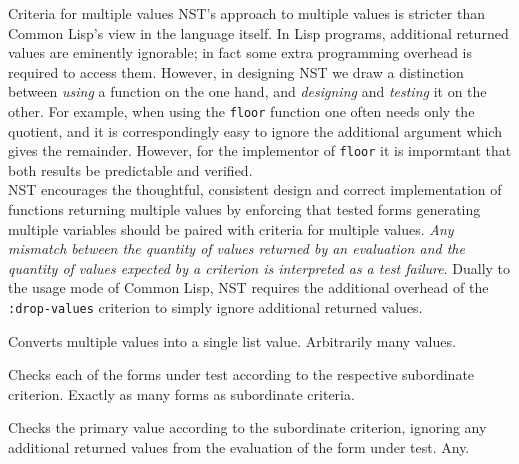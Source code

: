 \begin{criteriaGroup}{Criteria for multiple values}{
NST's approach to multiple values is stricter than Common Lisp's view
in the language itself.  In Lisp programs, additional returned values
are eminently ignorable; in fact some extra programming overhead is
required to access them.  However, in designing NST we draw a
distinction between \emph{using} a function on the one hand, and
\emph{designing} and \emph{testing} it on the other.  For example,
when using the \texttt{floor} function one often needs only the
quotient, and it is correspondingly easy to ignore the additional
argument which gives the remainder.  However, for the implementor of
\texttt{floor} it is impormtant that both results be predictable and
verified.\vspace{\parskip}\\\hspace*{\parindent}NST encourages the
thoughtful, consistent design and correct implementation of functions
returning multiple values by enforcing that tested forms generating
multiple variables should be paired with criteria for multiple values.
\emph{Any mismatch between the quantity of values returned by an
  evaluation and the quantity of values expected by a criterion is
  interpreted as a test failure}.  Dually to the usage mode of Common
Lisp, NST requires the additional overhead of the
\texttt{:drop-values} criterion to simply ignore additional returned
values.}

{Converts multiple values into a single list value.}
{Arbitrarily many values.}
{\noExpl}{\noEx}{}

{Checks each of the forms under test according to the respective
  subordinate criterion.}
{Exactly as many forms as subordinate criteria.}
{\noExpl}{\noEx}{}

{Checks the primary value according to the subordinate criterion,
  ignoring any additional returned values from the evaluation of the
  form under test.}
{Any.}
{\noExpl}{\noEx}{}

\end{criteriaGroup}

